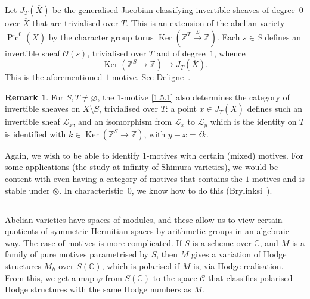 \documentclass{article}
\theoremstyle{plain}
\theoremstyle{definition}
\newtheorem*{remark}{Remark}
\newcommand{\sh}{\mathscr}
\newcommand{\ZZ}{\mathbb{Z}}
\newcommand{\CC}{\mathbb{C}}
\DeclareMathOperator{\Pic}{Pic}
\DeclareMathOperator{\Ker}{Ker}
\begin{document}
Let $J_T(\overline{X})$ be the generalised Jacobian classifying invertible sheaves of degree~$0$ over $\overline{X}$ that are trivialised over $T$.
This is an extension of the abelian variety $\Pic^0(\overline{X})$ by the character group torus $\Ker(\ZZ^T\xrightarrow{\Sigma}\ZZ)$.
Each $s\in S$ defines an invertible sheaf $\sh{O}(s)$, trivialised over $T$ and of degree~$1$, whence
\[
\label{1.5.1}
  \Ker(\ZZ^S\to\ZZ) \to J_T(\overline{X}).
\tag{1.5.1}
\]
This is the aforementioned $1$-motive.
See Deligne~\cite[§10]{9}.

\begin{remark}
  For $S,T\neq\varnothing$, the $1$-motive \cref{1.5.1} also determines the category of invertible sheaves on $\overline{X}\setminus S$, trivialised over $T$: a point $x\in J_T(\overline{X})$ defines such an invertible sheaf $\sh{L}_x$, and an isomorphism from $\sh{L}_x$ to $\sh{L}_y$ which is the identity on $T$ is identified with $k\in\Ker(\ZZ^S\to\ZZ)$, with $y-x=\delta k$.
\end{remark}

Again, we wish to be able to identify $1$-motives with certain (mixed) motives.
For some applications (the study at infinity of Shimura varieties), we would be content with even having a category of motives that contains the $1$-motives and is stable under $\otimes$.
In characteristic~$0$, we know how to do this (Brylinksi~\cite{7}).


\subsection{}
\label{1.6}

Abelian varieties have spaces of modules, and these allow us to view certain quotients of symmetric Hermitian spaces by arithmetic groups in an algebraic way.
The case of motives is more complicated.
If $S$ is a scheme over $\CC$, and $M$ is a family of pure motives parametrised by $S$, then $M$ gives a variation of Hodge structures $M_h$ over $S(\CC)$, which is polarised if $M$ is, via Hodge realisation.
From this, we get a map $\varphi$ from $S(\CC)$ to the space $\mathscr{C}$ that classifies polarised Hodge structures with the same Hodge numbers as $M$.
\end{document}
